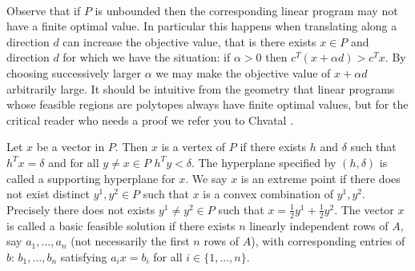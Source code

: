 \paragraph{}Observe that if $P$ is unbounded then the corresponding linear program may not have a finite optimal value. In particular this happens when translating along a direction $d$ can increase the objective value, that is there exists $x \in P$  and direction $d$ for which we have the situation: if $\alpha > 0$ then $c^T(x + \alpha d) > c^Tx$. By choosing successively larger $\alpha$ we may make the objective value of $x + \alpha d$ arbitrarily large. It should be intuitive from the geometry that linear programs whose feasible regions are polytopes always have finite optimal values, but for the critical reader who needs a proof we refer you to Chvatal \cite{chvatal1983linear}.
\begin{definition}
Let $x$ be a vector in $P$. Then $x$ is a vertex of $P$ if there exists $h$ and $\delta$ such that $h^Tx = \delta$ and for all $y \neq x \in P$ $h^Ty < \delta$. The hyperplane specified by $(h,\delta)$ is called a supporting hyperplane for $x$. We say $x$ is an extreme point if there does not exist distinct $y^1, y^2 \in P$ such that $x$ is a convex combination of $y^1, y^2$. Precisely there does not exists $y^1 \neq y^2 \in P$ such that $x = \frac{1}{2} y^1 + \frac{1}{2}y^2$. The vector $x$ is called a basic feasible solution if there exists $n$ linearly independent rows of $A$, say $a_1, \dots, a_n$ (not necessarily the first $n$ rows of $A$), with corresponding entries of $b$: $b_1, \dots, b_n$ satisfying $a_i x = b_i$ for all $i\in \{1,\dots, n\}$.
\end{definition}
